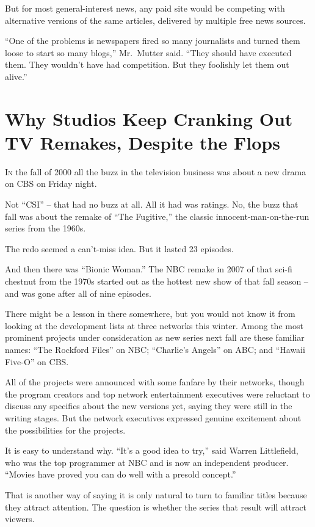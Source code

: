 ﻿\documentclass[12pt]{article}
\begin{document}
But for most general-interest news, any paid site would be competing with alternative versions of
the same articles, delivered by multiple free news sources.

``One of the problems is newspapers fired so many journalists and turned them loose to start so many
blogs,'' Mr.~Mutter said. ``They should have executed them. They wouldn't have had competition. But
they foolishly let them out alive.''

\section{Why Studios Keep Cranking Out TV Remakes, Despite the Flops}

\lettrine{I}{n} the fall of 2000 all the buzz in the television business was
about a new drama on CBS on Friday night.

Not ``CSI'' -- that had no buzz at all. All it had was ratings. No, the buzz that fall was about the
remake of ``The Fugitive,'' the classic innocent-man-on-the-run series from the 1960s.

The redo seemed a can't-miss idea. But it lasted 23 episodes.

And then there was ``Bionic Woman.'' The NBC remake in 2007 of that sci-fi chestnut from the 1970s
started out as the hottest new show of that fall season -- and was gone after all of nine episodes.

There might be a lesson in there somewhere, but you would not know it from looking at the
development lists at three networks this winter. Among the most prominent projects under
consideration as new series next fall are these familiar names: ``The Rockford Files'' on NBC;
``Charlie's Angels'' on ABC; and ``Hawaii Five-O'' on CBS.

All of the projects were announced with some fanfare by their networks, though the program creators
and top network entertainment executives were reluctant to discuss any specifics about the new
versions yet, saying they were still in the writing stages. But the network executives expressed
genuine excitement about the possibilities for the projects.

It is easy to understand why. ``It's a good idea to try,'' said Warren Littlefield, who was the top
programmer at NBC and is now an independent producer. ``Movies have proved you can do well with a
presold concept.''

That is another way of saying it is only natural to turn to familiar titles because they attract
attention. The question is whether the series that result will attract viewers.
\end{document}
